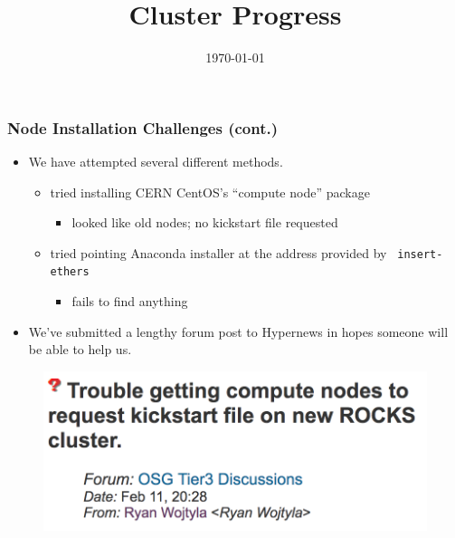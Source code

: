 \documentclass{beamer}
\title{Cluster Progress}
\date{\today}
\begin{document}

\begin{frame}
\titlepage
\end{frame}



\begin{frame}

  \frametitle{Node Installation Challenges (cont.)}

  \begin{itemize}
  \item We have attempted several different methods.
    \begin{itemize}
      \item tried installing CERN CentOS's ``compute node'' package
        \begin{itemize}
        \item looked like old nodes; no kickstart file requested
        \end{itemize}
      \item tried pointing Anaconda installer at the address provided by {\tt
          insert-ethers}
        \begin{itemize}
        \item fails to find anything
        \end{itemize}
    \end{itemize}
  \item We've submitted a lengthy forum post to Hypernews in hopes someone will
    be able to help us.
  \end{itemize}

  \begin{figure}[H]
    \begin{center}
      \includegraphics[scale=0.7]{forumPost.png}
    \end{center}
  \end{figure}
    
\end{frame}

\end{document}
